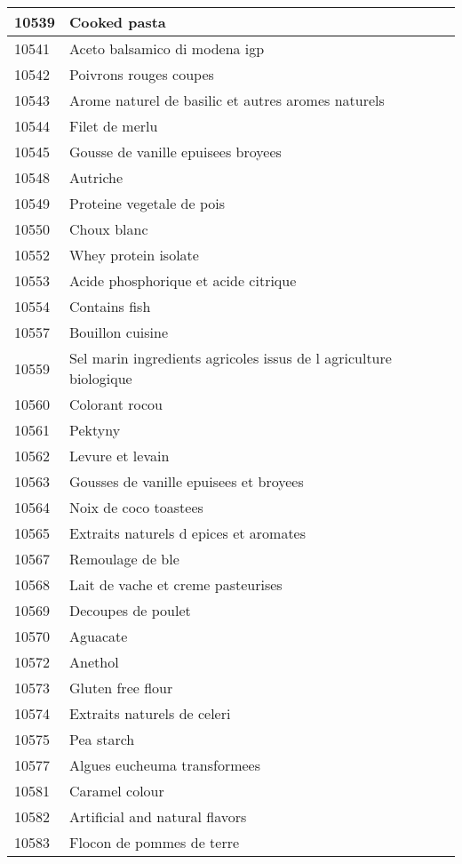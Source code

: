 \begin{longtable}{|l|l|}
10539 & Cooked pasta \\ \hline 
10541 & Aceto balsamico di modena igp \\ \hline 
10542 & Poivrons rouges coupes \\ \hline 
10543 & Arome naturel de basilic et autres aromes naturels \\ \hline 
10544 & Filet de merlu \\ \hline 
10545 & Gousse de vanille epuisees broyees \\ \hline 
10548 & Autriche \\ \hline 
10549 & Proteine vegetale de pois \\ \hline 
10550 & Choux blanc \\ \hline 
10552 & Whey protein isolate \\ \hline 
10553 & Acide phosphorique et acide citrique \\ \hline 
10554 & Contains fish \\ \hline 
10557 & Bouillon cuisine \\ \hline 
10559 & Sel marin  ingredients agricoles issus de l agriculture biologique \\ \hline 
10560 & Colorant rocou \\ \hline 
10561 & Pektyny \\ \hline 
10562 & Levure et levain \\ \hline 
10563 & Gousses de vanille epuisees et broyees \\ \hline 
10564 & Noix de coco toastees \\ \hline 
10565 & Extraits naturels d epices et aromates \\ \hline 
10567 & Remoulage de ble \\ \hline 
10568 & Lait de vache et creme pasteurises \\ \hline 
10569 & Decoupes de poulet \\ \hline 
10570 & Aguacate \\ \hline 
10572 & Anethol \\ \hline 
10573 & Gluten free flour \\ \hline 
10574 & Extraits naturels de celeri \\ \hline 
10575 & Pea starch \\ \hline 
10577 & Algues eucheuma transformees \\ \hline 
10581 & Caramel colour \\ \hline 
10582 & Artificial and natural flavors \\ \hline 
10583 & Flocon de pommes de terre \\ \hline 

\end{longtable}
